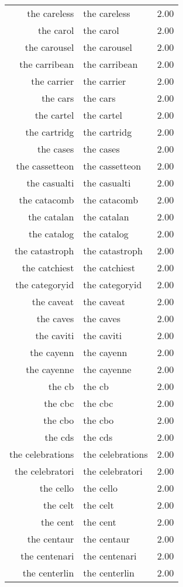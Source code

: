 \begin{table}[ht]
\begin{tabular}{rlr}
  the careless & the careless & 2.00 \\ 
  the carol & the carol & 2.00 \\ 
  the carousel & the carousel & 2.00 \\ 
  the carribean & the carribean & 2.00 \\ 
  the carrier & the carrier & 2.00 \\ 
  the cars & the cars & 2.00 \\ 
  the cartel & the cartel & 2.00 \\ 
  the cartridg & the cartridg & 2.00 \\ 
  the cases & the cases & 2.00 \\ 
  the cassetteon & the cassetteon & 2.00 \\ 
  the casualti & the casualti & 2.00 \\ 
  the catacomb & the catacomb & 2.00 \\ 
  the catalan & the catalan & 2.00 \\ 
  the catalog & the catalog & 2.00 \\ 
  the catastroph & the catastroph & 2.00 \\ 
  the catchiest & the catchiest & 2.00 \\ 
  the categoryid & the categoryid & 2.00 \\ 
  the caveat & the caveat & 2.00 \\ 
  the caves & the caves & 2.00 \\ 
  the caviti & the caviti & 2.00 \\ 
  the cayenn & the cayenn & 2.00 \\ 
  the cayenne & the cayenne & 2.00 \\ 
  the cb & the cb & 2.00 \\ 
  the cbc & the cbc & 2.00 \\ 
  the cbo & the cbo & 2.00 \\ 
  the cds & the cds & 2.00 \\ 
  the celebrations & the celebrations & 2.00 \\ 
  the celebratori & the celebratori & 2.00 \\ 
  the cello & the cello & 2.00 \\ 
  the celt & the celt & 2.00 \\ 
  the cent & the cent & 2.00 \\ 
  the centaur & the centaur & 2.00 \\ 
  the centenari & the centenari & 2.00 \\ 
  the centerlin & the centerlin & 2.00 \\ 

\end{tabular}
\end{table}
